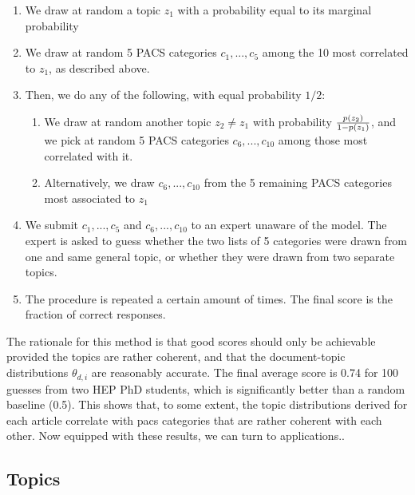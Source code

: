 \documentclass[smallextended]{svjour3}
\begin{document}
\begin{enumerate}
    \item We draw at random a topic $z_1$ with a probability equal to its marginal probability 
    \item We draw at random 5 PACS categories $c_1,...,c_5$ among the 10 most correlated to $z_1$, as described above.
    \item Then, we do any of the following, with equal probability $1/2$:
    \begin{enumerate}
        \item We draw at random another topic $z_2\neq z_1$ with probability $p(z_2)\over 1-p(z_1)$, and we pick at random 5 PACS categories $c_6,...,c_{10}$ among those most correlated with it.
        \item Alternatively, we draw  $c_6,...,c_{10}$ from the 5 remaining PACS categories most associated to $z_1$
    \end{enumerate}
    \item We submit $c_1, ..., c_5$ and $c_6, ..., c_{10}$ to an expert unaware of the model. The expert is asked to guess whether the two lists of 5 categories were drawn from one and same general topic, or whether they were drawn from two separate topics.
    \item The procedure is repeated a certain amount of times. The final score is the fraction of correct responses.
\end{enumerate}

The rationale for this method is that good scores should only be achievable provided the topics are rather coherent, and that the document-topic distributions $\theta_{d,i}$ are reasonably accurate. The final average score is 0.74 for 100 guesses from two HEP PhD students, which is significantly better than a random baseline (0.5). This shows that, to some extent, the topic distributions derived for each article correlate with \gls{pacs} categories that are rather coherent with each other. Now equipped with these results, we can turn to applications..


\subsection{Topics}


\fontsize{6}{7}\selectfont\normalsize
\fontsize{6}{7}\selectfont\normalsize


\end{document}
